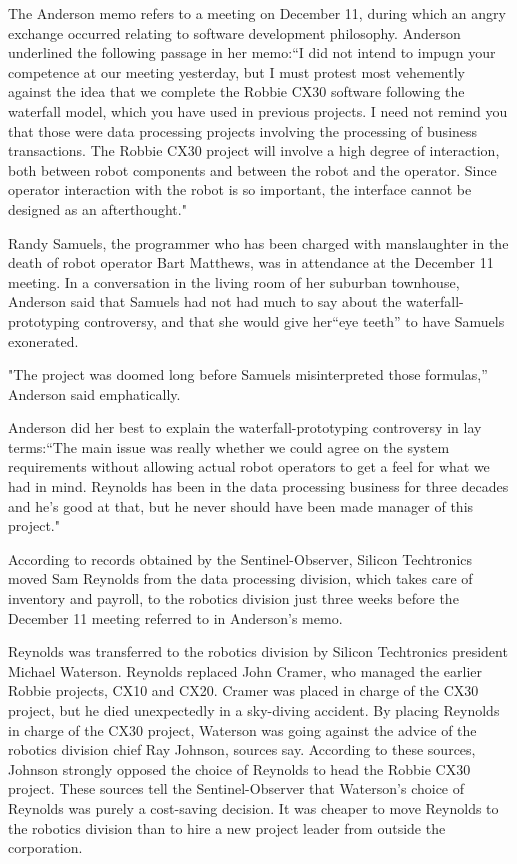 The Anderson memo refers to a meeting on December 11, during which an angry exchange occurred relating to software development philosophy. Anderson underlined the following passage in her memo:``I did not intend to impugn your competence at our meeting yesterday, but I must protest most vehemently against the idea that we complete the Robbie CX30 software following the waterfall model, which you have used in previous projects. I need not remind you that those were data processing projects involving the processing of business transactions. The Robbie CX30 project will involve a high degree of interaction, both between robot components and between the robot and the operator. Since operator interaction with the robot is so important, the interface cannot be designed as an afterthought."

Randy Samuels, the programmer who has been charged with manslaughter in the death of robot operator Bart Matthews, was in attendance at the December 11 meeting. In a conversation in the living room of her suburban townhouse, Anderson said that Samuels had not had much to say about the waterfall-prototyping controversy, and that she would give her``eye teeth'' to have Samuels exonerated.

"The project was doomed long before Samuels misinterpreted those formulas,'' Anderson said emphatically.

Anderson did her best to explain the waterfall-prototyping controversy in lay terms:``The main issue was really whether we could agree on the system requirements without allowing actual robot operators to get a feel for what we had in mind. Reynolds has been in the data processing business for three decades and he's good at that, but he never should have been made manager of this project."

According to records obtained by the Sentinel-Observer, Silicon Techtronics moved Sam Reynolds from the data processing division, which takes care of inventory and payroll, to the robotics division just three weeks before the December 11 meeting referred to in Anderson's memo.

Reynolds was transferred to the robotics division by Silicon Techtronics president Michael Waterson. Reynolds replaced John Cramer, who managed the earlier Robbie projects, CX10 and CX20. Cramer was placed in charge of the CX30 project, but he died unexpectedly in a sky-diving accident. By placing Reynolds in charge of the CX30 project, Waterson was going against the advice of the robotics division chief Ray Johnson, sources say. According to these sources, Johnson strongly opposed the choice of Reynolds to head the Robbie CX30 project. These sources tell the Sentinel-Observer that Waterson's choice of Reynolds was purely a cost-saving decision. It was cheaper to move Reynolds to the robotics division than to hire a new project leader from outside the corporation.


